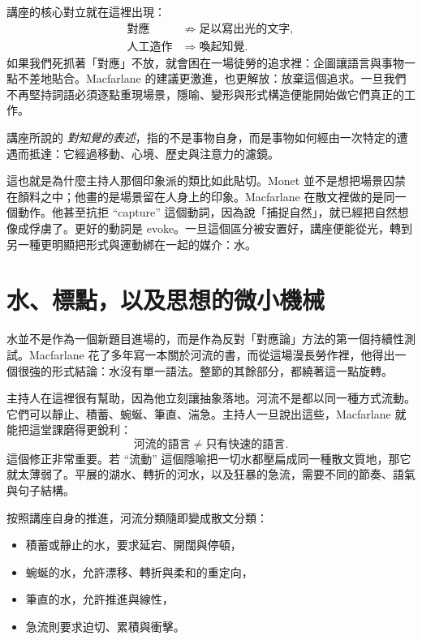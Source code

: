 講座的核心對立就在這裡出現：
\begin{align}
\text{對應} &\not\Rightarrow \text{足以寫出光的文字},\\
\text{人工造作} &\Rightarrow \text{喚起知覺}.
\end{align}
如果我們死抓著「對應」不放，就會困在一場徒勞的追求裡：企圖讓語言與事物一點不差地貼合。Macfarlane 的建議更激進，也更解放：放棄這個追求。一旦我們不再堅持詞語必須逐點重現場景，隱喻、變形與形式構造便能開始做它們真正的工作。

\begin{definition}
講座所說的 \emph{對知覺的表述}，指的不是事物自身，而是事物如何經由一次特定的遭遇而抵達：它經過移動、心境、歷史與注意力的濾鏡。
\end{definition}

這也就是為什麼主持人那個印象派的類比如此貼切。Monet 並不是想把場景囚禁在顏料之中；他畫的是場景留在人身上的印象。Macfarlane 在散文裡做的是同一個動作。他甚至抗拒 ``capture'' 這個動詞，因為說「捕捉自然」，就已經把自然想像成俘虜了。更好的動詞是 evoke。一旦這個區分被安置好，講座便能從光，轉到另一種更明顯把形式與運動綁在一起的媒介：水。

\section{水、標點，以及思想的微小機械}

水並不是作為一個新題目進場的，而是作為反對「對應論」方法的第一個持續性測試。Macfarlane 花了多年寫一本關於河流的書，而從這場漫長勞作裡，他得出一個很強的形式結論：水沒有單一語法。整節的其餘部分，都繞著這一點旋轉。

主持人在這裡很有幫助，因為他立刻讓抽象落地。河流不是都以同一種方式流動。它們可以靜止、積蓄、蜿蜒、筆直、湍急。主持人一旦說出這些，Macfarlane 就能把這堂課磨得更銳利：
\begin{equation}
\text{河流的語言} \neq \text{只有快速的語言}.
\end{equation}
這個修正非常重要。若 ``流動'' 這個隱喻把一切水都壓扁成同一種散文質地，那它就太薄弱了。平展的湖水、轉折的河水，以及狂暴的急流，需要不同的節奏、語氣與句子結構。

按照講座自身的推進，河流分類隨即變成散文分類：
\begin{itemize}
\item 積蓄或靜止的水，要求延宕、開闊與停頓，
\item 蜿蜒的水，允許漂移、轉折與柔和的重定向，
\item 筆直的水，允許推進與線性，
\item 急流則要求迫切、累積與衝擊。
\end{itemize}

